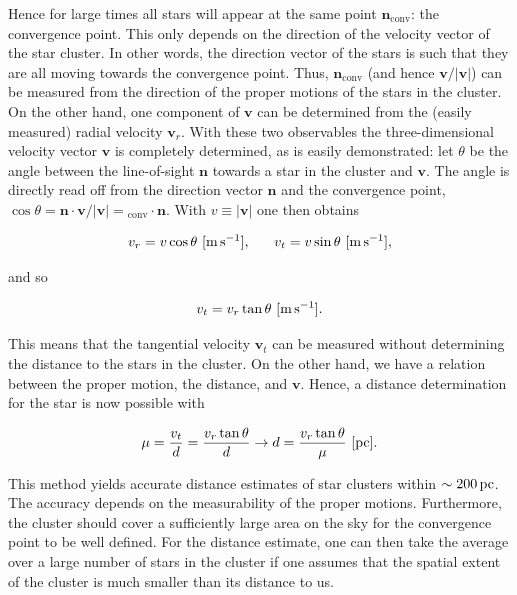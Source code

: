 \documentclass[a4paper,11pt]{article}
\begin{document}
{\noindent}Hence for large times all stars will appear at the same point $\mathbf{n}_\mathrm{conv}$: the convergence point. This only depends on the direction of the velocity vector of the star cluster. In other words, the direction vector of the stars is such that they are all moving towards the convergence point. Thus, $\mathbf{n}_\mathrm{conv}$ (and hence $\mathbf{v}/\lvert\mathbf{v}\rvert$) can be measured from the direction of the proper motions of the stars in the cluster. On the other hand, one component of $\mathbf{v}$ can be determined from the (easily measured) radial velocity $\mathbf{v}_r$. With these two observables the three-dimensional velocity vector $\mathbf{v}$ is completely determined, as is easily demonstrated: let $\theta$ be the angle between the line-of-sight $\mathbf{n}$ towards a star in the cluster and $\mathbf{v}$. The angle is directly read off from the direction vector $\mathbf{n}$ and the convergence point, $\cos\theta = \mathbf{n}\cdot\mathbf{v}/\lvert\mathbf{v}\rvert = \mathbf{}_\mathrm{conv}\cdot\mathbf{n}$. With $v\equiv\lvert\mathbf{v}\rvert$ one then obtains

\begin{align*}
    v_r = v\cos\theta ~ [{\rm m\,s^{-1}}], ~~~~~ v_t = v\sin\theta ~ [{\rm m\,s^{-1}}],
\end{align*}

{\noindent}and so

\begin{align*}
    v_t = v_r\tan\theta ~ [{\rm m\,s^{-1}}].
\end{align*}

{\noindent}This means that the tangential velocity $\mathbf{v}_t$ can be measured without determining the distance to the stars in the cluster. On the other hand, we have a relation between the proper motion, the distance, and $\mathbf{v}$. Hence, a distance determination for the star is now possible with

\begin{align*}
    \mu = \frac{v_t}{d} = \frac{v_r\tan\theta}{d} \rightarrow d = \frac{v_r\tan\theta}{\mu} ~ [{\rm pc}].
\end{align*}

{\noindent}This method yields accurate distance estimates of star clusters within $\sim200\,{\rm pc}$. The accuracy depends on the measurability of the proper motions. Furthermore, the cluster should cover a sufficiently large area on the sky for the convergence point to be well defined. For the distance estimate, one can then take the average over a large number of stars in the cluster if one assumes that the spatial extent of the cluster is much smaller than its distance to us.
\end{document}
